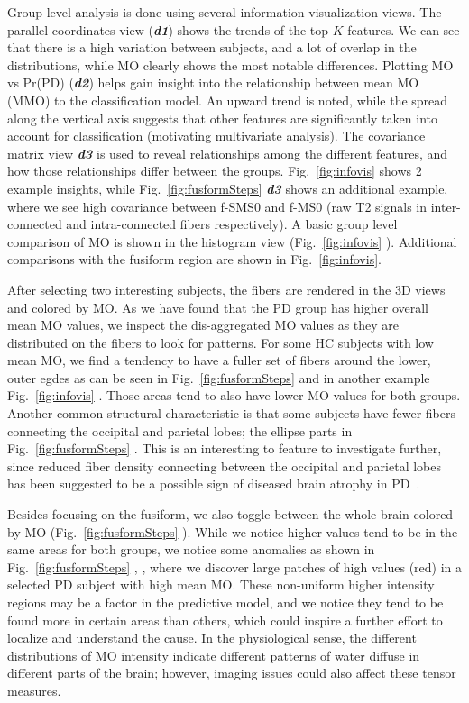 Group level analysis is done using several information visualization views. The parallel coordinates view (\textbf{\textit{d1}}) shows the trends of the top $K$ features. We can see that there is a high variation between subjects, and a lot of overlap in the distributions, while MO clearly shows the most notable differences. Plotting MO vs Pr(PD) (\textbf{\textit{d2}}) helps gain insight into the relationship between mean MO (MMO) to the classification model. An upward trend is noted, while the spread along the vertical axis suggests that other features are significantly taken into account for classification (motivating multivariate analysis). The covariance matrix view \textbf{\textit{d3}} is used to reveal relationships among the different features, and how those relationships differ between the groups. Fig.~\ref{fig:infovis} shows 2 example insights, while Fig.~\ref{fig:fusformSteps} \textbf{\textit{d3}} shows an additional example, where we see high covariance between f-SMS0 and f-MS0 (raw T2 signals in inter-connected and intra-connected fibers respectively). A basic group level comparison of MO is shown in the histogram view (Fig.~\ref{fig:infovis} ). Additional comparisons with the fusiform region are shown in Fig.~\ref{fig:infovis}. 

After selecting two interesting subjects, the fibers are rendered in the 3D views and colored by MO. As we have found that the PD group has higher overall mean MO values, we inspect the dis-aggregated MO values as they are distributed on the fibers to look for patterns. For some HC subjects with low mean MO, we find a tendency to have a fuller set of fibers around the lower, outer egdes as can be seen in Fig.~\ref{fig:fusformSteps}  and in another example Fig.~\ref{fig:infovis} . Those areas tend to also have lower MO values for both groups. Another common structural characteristic is that some subjects have fewer fibers connecting the occipital and parietal lobes; the ellipse parts in Fig.~\ref{fig:fusformSteps} . This is an interesting to feature to investigate further, since reduced fiber density connecting between the occipital and parietal lobes has been suggested to be a possible sign of diseased brain atrophy in PD~\cite{10.1093/brain/awh088}. 

Besides focusing on the fusiform, we also toggle between the whole brain colored by MO (Fig.~\ref{fig:fusformSteps} ). While we notice higher values tend to be in the same areas for both groups, we notice some anomalies as shown in Fig.~\ref{fig:fusformSteps} , , where we discover large patches of high values (red) in a selected PD subject with high mean MO. These non-uniform higher intensity regions may be a factor in the predictive model, and we notice they tend to be found more in certain areas than others, which could inspire a further effort to localize and understand the cause. In the physiological sense, the different distributions of MO intensity indicate different patterns of water diffuse in different parts of the brain; however, imaging issues could also affect these tensor measures.

